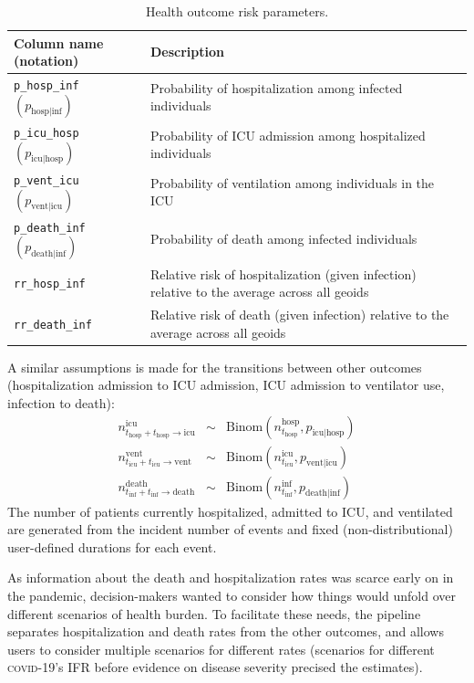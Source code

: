 {\begin{table}[t]
\label{tab:csp-outcomes}
\centering
\begin{tabular}{ll}
\toprule
 Column name (notation) & Description\\
\midrule
\verb|p_hosp_inf| $(p_{\text{hosp} \mid \text{inf}})$	& Probability of hospitalization among infected individuals\\
\verb|p_icu_hosp| $(p_{\text{icu} \mid \text{hosp}})$	&Probability of ICU admission among hospitalized individuals\\
\verb|p_vent_icu| $(p_{\text{vent} \mid \text{icu}})$ &	Probability of ventilation among individuals in the ICU\\
\verb|p_death_inf| $(p_{\text{death} \mid \text{inf}})$ &	Probability of death among infected individuals\\
\verb|rr_hosp_inf|	& Relative risk of hospitalization (given infection) relative to the average across all geoids\\
\verb|rr_death_inf| & Relative risk of death (given infection) relative to the average across all geoids\\
\bottomrule
\end{tabular}
\caption[Health outcome risk parameters]{Health outcome risk parameters.}
\end{table}

A similar assumptions is made for the transitions between other outcomes (hospitalization admission to ICU admission, ICU admission to ventilator use, infection to death):
\begin{eqnarray}
n_{t_\text{hosp} + t_\text{hosp}\to \text{icu}}^\text{icu} &\sim & \text{Binom}\left(n_{t_\text{hosp}}^\text{hosp} , p_{\text{icu}\mid \text{hosp}} \right)\\
n_{t_\text{icu} + t_\text{icu} \to \text{vent}}^\text{vent} &\sim & \text{Binom}\left(n_{t_\text{icu}}^\text{icu}, p_{\text{vent} \mid \text{icu}} \right) \\
n_{t_\text{inf} + t_\text{inf} \to \text{death}}^\text{death} &\sim & \text{Binom}\left(n_{t_\text{inf}}^\text{inf}, p_{\text{death}\mid \text{inf}}  \right)
\end{eqnarray}
The number of patients currently hospitalized, admitted to ICU, and ventilated are generated from the incident number of events and fixed (non-distributional) user-defined durations for each event.

As information about the death and hospitalization rates was scarce early on in the pandemic, decision-makers wanted to consider how things would unfold over different scenarios of health burden. To facilitate these needs, the pipeline separates hospitalization and death rates from the other outcomes, and allows users to consider multiple scenarios for different rates (\eg scenarios for different \textsc{covid}-19's IFR before evidence on disease severity precised the estimates).

}
